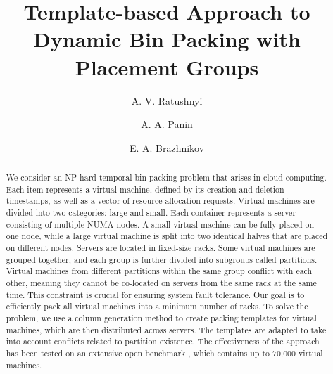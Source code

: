 \documentclass[12pt]{llncs}
\begin{document}
\begin{englishtitle} %
\title{
Template-based Approach to Dynamic Bin Packing with Placement Groups
}


\author{
A. V. Ratushnyi  \and A. A. Panin  \and E. A. Brazhnikov
}
\maketitle


\begin{abstract}

We consider an NP-hard temporal bin packing problem that arises in cloud computing.
Each item represents a virtual machine, defined by its creation and deletion timestamps, as well as a vector of resource allocation requests.
Virtual machines are divided into two categories: large and small.
Each container represents a server consisting of multiple NUMA nodes.
A small virtual machine can be fully placed on one node, while a large virtual machine is split into two identical halves that are placed on different nodes.
Servers are located in fixed-size racks.
Some virtual machines are grouped together, and each group is further divided into subgroups called partitions.
Virtual machines from different partitions within the same group conflict with each other, meaning they cannot be co-located on servers from the same rack at the same time.
This constraint is crucial for ensuring system fault tolerance.
Our goal is to efficiently pack all virtual machines into a minimum number of racks.
To solve the problem, we use a column generation method to create packing templates for virtual machines, which are then distributed across servers.
The templates are adapted to take into account conflicts related to partition existence.
The effectiveness of the approach has been tested on an extensive open benchmark \cite{benchmark}, which contains up to 70,000 virtual machines.

\end{abstract}
\end{englishtitle}


\end{document}
